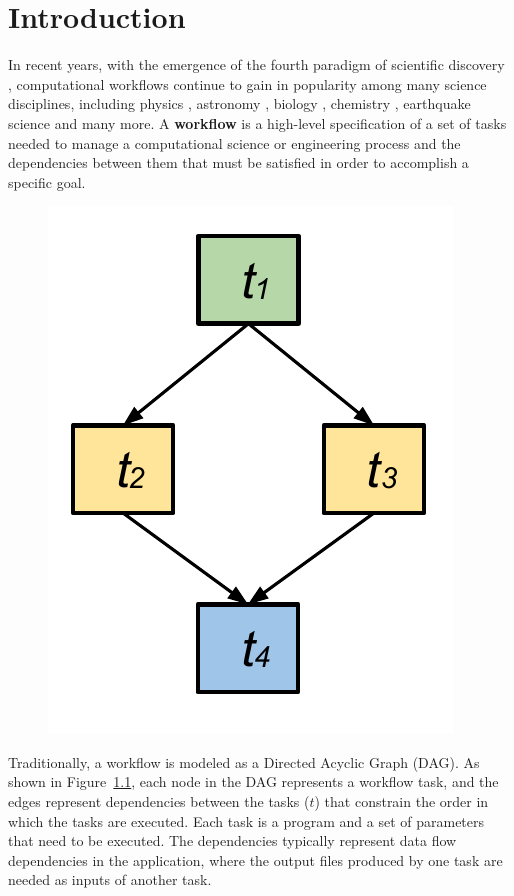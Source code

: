 \chapter{Introduction}


In recent years, with the emergence of the fourth paradigm of scientific discovery \cite{Hey2009}, computational workflows continue to gain in popularity among many science disciplines, including physics \cite{Deelman2002}, astronomy \cite{Sakellariou2010}, biology \cite{Lathers2006, Oinn2004}, chemistry \cite{Wieczorek2005}, earthquake science \cite{Maechling2007} and many more. 
A \textbf{workflow} is a high-level specification of a set of tasks needed to manage a computational science or engineering process and the dependencies between them that must be satisfied in order to accomplish a specific goal.


\begin{figure}[h!]
\includegraphics[width=0.3\linewidth]{figures/model/dag.pdf}
\centering
  \label{fig:intro_dag}
\end{figure}

Traditionally, a workflow is modeled as a Directed Acyclic Graph (DAG). As shown in Figure~\ref{fig:intro_dag}, each node in the DAG represents a workflow task, and the edges represent dependencies between the tasks ($t$) that constrain the order in which the tasks are executed. Each task is a program and a set of parameters that need to be executed. The dependencies typically represent data flow dependencies in the application, where the output files produced by one task are needed as inputs of another task. 


